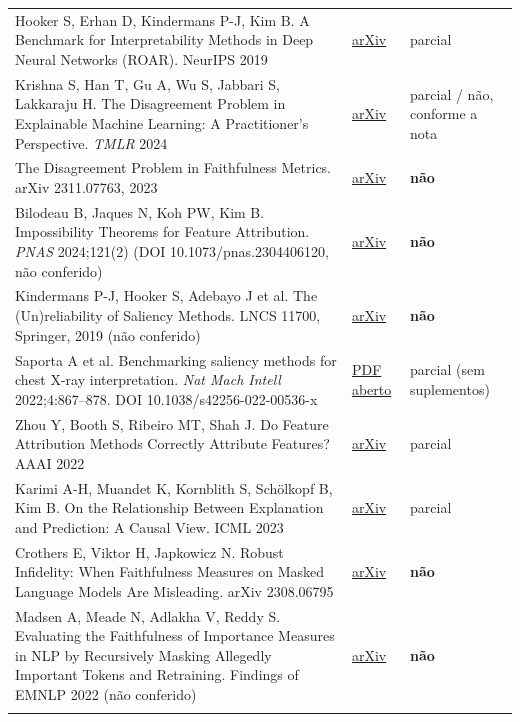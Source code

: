 \documentclass[11pt,a4paper]{article}
\begin{document}
{\begin{xltabular}{\linewidth}{>{\raggedright\arraybackslash}X>{\raggedright\arraybackslash}X>{\raggedright\arraybackslash}X}
Hooker S, Erhan D, Kindermans P-J, Kim B. A Benchmark for Interpretability Methods in Deep Neural Networks (ROAR). NeurIPS 2019 & \href{https://arxiv.org/abs/1806.10758}{arXiv} & parcial \\ \addlinespace[1pt]
Krishna S, Han T, Gu A, Wu S, Jabbari S, Lakkaraju H. The Disagreement Problem in Explainable Machine Learning: A Practitioner's Perspective. \textit{TMLR} 2024 & \href{https://arxiv.org/abs/2202.01602}{arXiv} & parcial / não, conforme a nota \\ \addlinespace[1pt]
The Disagreement Problem in Faithfulness Metrics. arXiv 2311.07763, 2023 & \href{https://arxiv.org/abs/2311.07763}{arXiv} & \textbf{não} \\ \addlinespace[1pt]
Bilodeau B, Jaques N, Koh PW, Kim B. Impossibility Theorems for Feature Attribution. \textit{PNAS} 2024;121(2) (DOI 10.1073/pnas.2304406120, não conferido) & \href{https://arxiv.org/abs/2212.11870}{arXiv} & \textbf{não} \\ \addlinespace[1pt]
Kindermans P-J, Hooker S, Adebayo J et al. The (Un)reliability of Saliency Methods. LNCS 11700, Springer, 2019 (não conferido) & \href{https://arxiv.org/abs/1711.00867}{arXiv} & \textbf{não} \\ \addlinespace[1pt]
Saporta A et al. Benchmarking saliency methods for chest X-ray interpretation. \textit{Nat Mach Intell} 2022;4:867–878. DOI 10.1038/s42256-022-00536-x & \href{https://asaporta.github.io/assets/pdf/chexlocalize.pdf}{PDF aberto} & parcial (sem suplementos) \\ \addlinespace[1pt]
Zhou Y, Booth S, Ribeiro MT, Shah J. Do Feature Attribution Methods Correctly Attribute Features? AAAI 2022 & \href{https://arxiv.org/abs/2104.14403}{arXiv} & parcial \\ \addlinespace[1pt]
Karimi A-H, Muandet K, Kornblith S, Schölkopf B, Kim B. On the Relationship Between Explanation and Prediction: A Causal View. ICML 2023 & \href{https://arxiv.org/abs/2212.06925}{arXiv} & parcial \\ \addlinespace[1pt]
Crothers E, Viktor H, Japkowicz N. Robust Infidelity: When Faithfulness Measures on Masked Language Models Are Misleading. arXiv 2308.06795 & \href{https://arxiv.org/abs/2308.06795}{arXiv} & \textbf{não} \\ \addlinespace[1pt]
Madsen A, Meade N, Adlakha V, Reddy S. Evaluating the Faithfulness of Importance Measures in NLP by Recursively Masking Allegedly Important Tokens and Retraining. Findings of EMNLP 2022 (não conferido) & \href{https://arxiv.org/abs/2110.08412}{arXiv} & \textbf{não} \\ \addlinespace[1pt]

\end{xltabular}}
\end{document}
